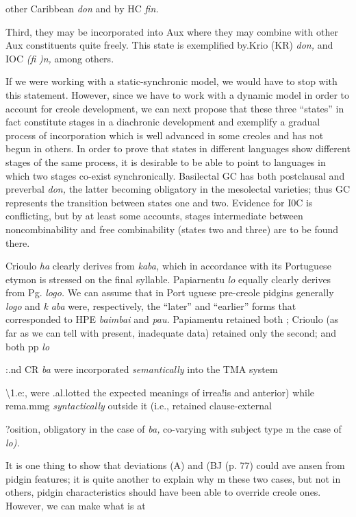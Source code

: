 other Caribbean \textit{don} and by HC \textit{fin.}

Third, they may be incorporated into Aux where they may combine with other Aux constituents quite freely. This state is exem\-plified by.Krio (KR) \textit{don,} and IOC \textit{(fi} \textit{)n,} among others.

If we were working with a static-synchronic model, we would have to stop with this statement. However, since we have to work with a dynamic model in order to account for creole development, we can next propose that these three ``states'' in fact constitute stages in a diachronic development and exemplify a gradual process of incorpora\-tion which is well advanced in some creoles and has not begun in others. In order to prove that states in different languages show differ\-ent stages of the same process, it is desirable to be able to point to languages in which two stages co-exist synchronically. Basilectal GC has both postclausal and preverbal \textit{don,} the latter becoming obligatory in the mesolectal varieties; thus GC represents the transition between states one and two. Evidence for I0C is conflicting, but by at least
some accounts, stages intermediate between noncombinability and free combinability (states two and three) are to be found there.

Crioulo \textit{ha} clearly derives from \textit{kaba,} which in accordance with its Portuguese etymon is stressed on the final syllable. Papiarnentu \textit{lo }equally clearly derives from Pg. \textit{logo.} We can assume that in Port uguese pre-creole pidgins generally \textit{logo} and \textit{k} \textit{aba} were, respectively, the ``later'' and ``earlier'' forms that corresponded to HPE \textit{baimbai }and \textit{pau.} Papiamentu retained both ; Crioulo (as far as we can tell with present, inadequate data) retained only the second; and both pp \textit{lo}

:.nd CR \textit{ba }were incorporated \textit{semantically }into the TMA system

{\textbackslash}1.e:, were .al.lotted the expected meanings of irrea!is and anterior) while rema.mmg \textit{syntactically }outside it (i.e., retained clause-external

?osition, obligatory in the case of \textit{ba, }co-varying with subject type m the case of \textit{lo).}

It is one thing to show that deviations (A) and (BJ (p. 77) could ave ansen from pidgin features; it is quite another to explain why m these two cases, but not in others, pidgin characteristics should have been able to override creole ones. However, we can make what is at


